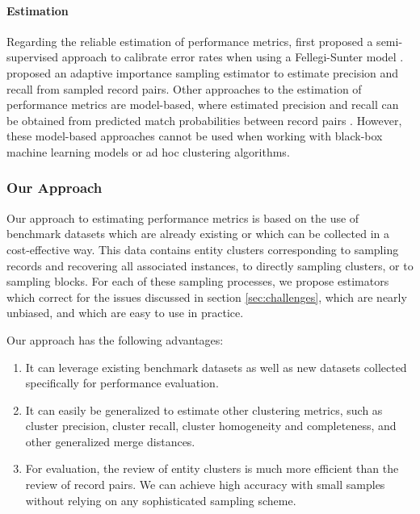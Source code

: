 \documentclass[fontsize=11pt]{article}
\theoremstyle{definition}
\begin{document}
\paragraph{Estimation}

Regarding the reliable estimation of performance metrics, \cite{Belin1995} first proposed a semi-supervised approach to calibrate error rates when using a Fellegi-Sunter model \citep{fellegi_theory_1969}. \cite{Marchant2017} proposed an adaptive importance sampling estimator to estimate precision and recall from sampled record pairs. Other approaches to the estimation of performance metrics are model-based, where estimated precision and recall can be obtained from predicted match probabilities between record pairs \citep{enamorado2019using}. However, these model-based approaches cannot be used when working with black-box machine learning models or ad hoc clustering algorithms.

\subsubsection{Our Approach}\label{sec:approach}

Our approach to estimating performance metrics is based on the use of benchmark datasets which are already existing or which can be collected in a cost-effective way. This data contains entity clusters corresponding to sampling records and recovering all associated instances, to directly sampling clusters, or to sampling blocks. For each of these sampling processes, we propose estimators which correct for the issues discussed in section \ref{sec:challenges}, which are nearly unbiased, and which are easy to use in practice.

Our approach has the following advantages:
\begin{enumerate}
    \item It can leverage existing benchmark datasets as well as new datasets collected specifically for performance evaluation.
    \item It can easily be generalized to estimate other clustering metrics, such as cluster precision, cluster recall, cluster homogeneity and completeness, and other generalized merge distances.
    \item For evaluation, the review of entity clusters is much more efficient than the review of record pairs. We can achieve high accuracy with small samples without relying on any sophisticated sampling scheme.
\end{enumerate}
\end{document}

